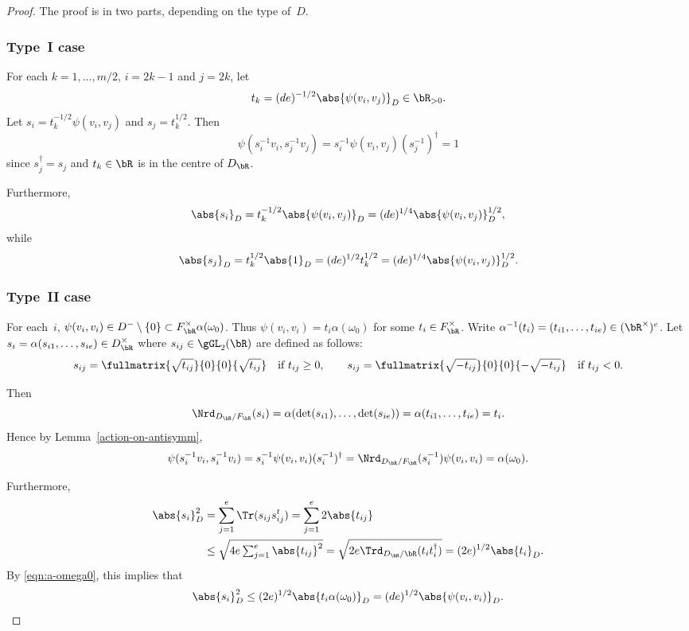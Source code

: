\begin{proof}
The proof is in two parts, depending on the type of~$D$.

\subsubsection*{Type~I case}
For each $k = 1, \dotsc, m/2$, $i=2k-1$ and $j=2k$, let
\[
t_k = (de)^{-1/2} \abs{\psi(v_i, v_j)}_D \in \bR_{>0}.
\]
Let $s_i = t_k^{-1/2} \psi(v_i, v_j)$ and $s_j = t_k^{1/2}$.
Then
\[
\psi(s_i^{-1} v_i, s_j^{-1} v_j) = s_i^{-1} \psi(v_i, v_j) (s_j^{-1})^\dag = 1
\]
since $s_j^\dag = s_j$ and $t_k \in \bR$ is in the centre of $D_\bR$.

Furthermore,
\[
\abs{s_i}_D = t_k^{-1/2} \abs{\psi(v_i, v_j)}_D = (de)^{1/4} \abs{\psi(v_i, v_j)}_D^{1/2},
\]
while
\[
\abs{s_j}_D = t_k^{1/2} \abs{1}_D = (de)^{1/2} t_k^{1/2} = (de)^{1/4} \abs{\psi(v_i, v_j)}_D^{1/2}.
\]

\subsubsection*{Type~II case}
For each~$i$, $\psi(v_i, v_i) \in D^- \setminus\{0\} \subset F_\bR^\times \alpha(\omega_0)$.
Thus $\psi(v_i, v_i) = t_i\alpha(\omega_0)$ for some $t_i \in F_\bR^\times$.
Write $\alpha^{-1}(t_i) = (t_{i1}, \dotsc, t_{ie}) \in (\bR^\times)^e$.
Let $s_i = \alpha(s_{i1}, \dotsc, s_{ie}) \in D_\bR^\times$ where $s_{ij} \in \gGL_2(\bR)$ are defined as follows:
\[
s_{ij} = \fullmatrix{\sqrt{t_{ij}}}{0}{0}{\sqrt{t_{ij}}} \quad\text{if } t_{ij} \geq 0,\qquad
s_{ij} = \fullmatrix{\sqrt{-t_{ij}}}{0}{0}{-\sqrt{-t_{ij}}} \quad\text{if } t_{ij} < 0.
\]

Then
\[
\Nrd_{D_\bR/F_\bR}(s_i) = \alpha(\det(s_{i1}), \dotsc, \det(s_{ie})) = \alpha(t_{i1}, \dotsc, t_{ie}) = t_i.
\]
Hence by Lemma~\ref{action-on-antisymm},
\[
\psi(s_i^{-1} v_i, s_i^{-1} v_i) = s_i^{-1} \psi(v_i, v_i) (s_i^{-1})^\dag = \Nrd_{D_\bR/F_\bR}(s_i^{-1}) \psi(v_i, v_i) = \alpha(\omega_0).
\]

Furthermore,
\begin{align*}
\abs{s_i}_D^2
& = \sum_{j=1}^e \Tr(s_{ij} s_{ij}^t)
= \sum_{j=1}^e 2\abs{t_{ij}}
\\& \leq \sqrt{4e \textstyle\sum_{j=1}^e \abs{t_{ij}}^2}
= \sqrt{2e \Trd_{D_\bR/\bR}(t_i t_i^\dag)}
= (2e)^{1/2} \abs{t_i}_D.
\end{align*}
By \eqref{eqn:a-omega0}, this implies that
\[
\abs{s_i}_D^2 \leq (2e)^{1/2} \abs{t_i\alpha(\omega_0)}_D = (de)^{1/2} \abs{\psi(v_i, v_i)}_D.
\qedhere
\]
\end{proof}

